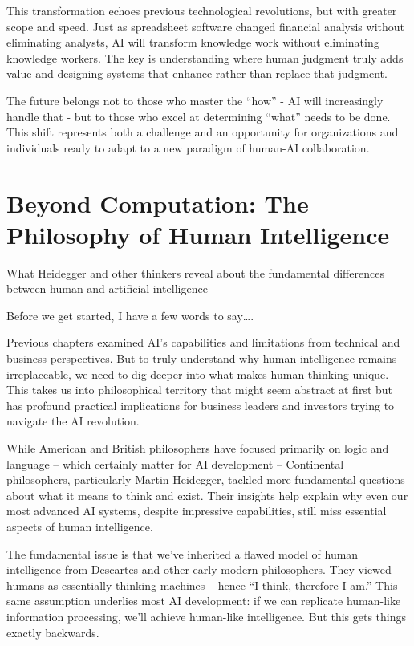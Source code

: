 \documentclass[
  Letterpaper,
]{scrbook}
\begin{document}
This transformation echoes previous technological revolutions, but with
greater scope and speed. Just as spreadsheet software changed financial
analysis without eliminating analysts, AI will transform knowledge work
without eliminating knowledge workers. The key is understanding where
human judgment truly adds value and designing systems that enhance
rather than replace that judgment.

The future belongs not to those who master the ``how'' - AI will
increasingly handle that - but to those who excel at determining
``what'' needs to be done. This shift represents both a challenge and an
opportunity for organizations and individuals ready to adapt to a new
paradigm of human-AI collaboration.


\chapter{Beyond Computation: The Philosophy of Human
Intelligence}\label{beyond-computation-the-philosophy-of-human-intelligence}

What Heidegger and other thinkers reveal about the fundamental
differences between human and artificial intelligence

\hfill\break

Before we get started, I have a few words to say\ldots.

Previous chapters examined AI's capabilities and limitations from
technical and business perspectives. But to truly understand why human
intelligence remains irreplaceable, we need to dig deeper into what
makes human thinking unique. This takes us into philosophical territory
that might seem abstract at first but has profound practical
implications for business leaders and investors trying to navigate the
AI revolution.

While American and British philosophers have focused primarily on logic
and language -- which certainly matter for AI development -- Continental
philosophers, particularly Martin Heidegger, tackled more fundamental
questions about what it means to think and exist. Their insights help
explain why even our most advanced AI systems, despite impressive
capabilities, still miss essential aspects of human intelligence.

The fundamental issue is that we've inherited a flawed model of human
intelligence from Descartes and other early modern philosophers. They
viewed humans as essentially thinking machines -- hence ``I think,
therefore I am.'' This same assumption underlies most AI development: if
we can replicate human-like information processing, we'll achieve
human-like intelligence. But this gets things exactly backwards.
\end{document}
